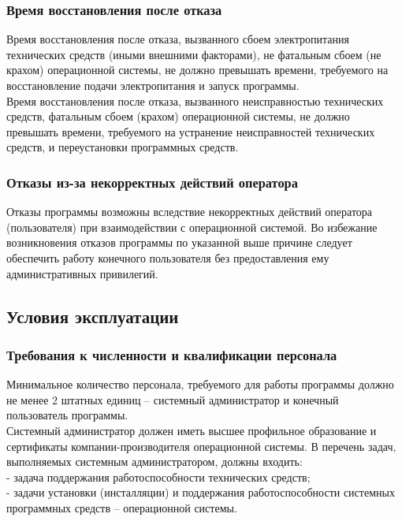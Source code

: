 \documentclass[14pt]{extarticle}
\begin{document}
        \subsubsection{Время восстановления после отказа}
        Время восстановления после отказа, вызванного сбоем электропитания технических средств (иными внешними факторами), не фатальным сбоем (не крахом) операционной системы, не должно превышать времени, требуемого на восстановление подачи электропитания и запуск программы.\\
        Время восстановления после отказа, вызванного неисправностью технических средств, фатальным сбоем (крахом) операционной системы, не должно превышать времени, требуемого на устранение неисправностей технических средств, и переустановки программных средств.
        
        \subsubsection{Отказы из-за некорректных действий оператора}
        Отказы программы возможны вследствие некорректных действий оператора (пользователя) при взаимодействии с операционной системой. Во избежание возникновения отказов программы по указанной выше причине следует обеспечить работу конечного пользователя без предоставления ему административных привилегий.
        
    \subsection{Условия эксплуатации}
        \subsubsection{Требования к численности и квалификации персонала}
        Минимальное количество персонала, требуемого для работы программы должно не менее 2 штатных единиц – системный администратор и конечный пользователь программы.\\
        Системный администратор должен иметь высшее профильное образование и сертификаты компании-производителя операционной системы. В перечень задач, выполняемых системным администратором, должны входить:\\
        -	задача поддержания работоспособности технических средств;\\
        -	задачи установки (инсталляции) и поддержания работоспособности системных программных средств – операционной системы.
\end{document}
